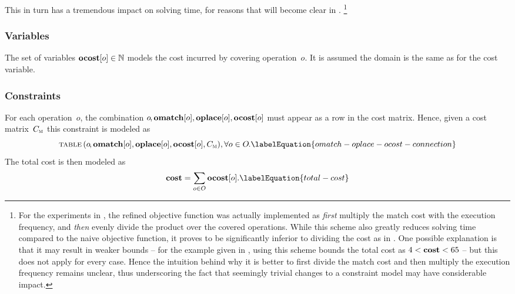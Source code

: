 %
This in turn has a tremendous impact on solving time, for reasons that will
become clear in .\!%
%
\footnote{%
  For the experiments in \cite{HjortBlindellEtAl:2017:CASES}, the refined
  \gls{objective function} was actually implemented as \emph{first} multiply the
  \gls{match} cost with the execution frequency, and \emph{then} evenly divide
  the product over the covered \glspl{operation}.
  While this scheme also greatly reduces solving time compared to the naive
  \gls{objective function}, it proves to be significantly inferior to dividing
  the cost as in .
  One possible explanation is that it may result in weaker bounds -- for the
  example given in , using this scheme bounds the total
  cost as \mbox{$4 < \mVar{cost} < 65$} -- but this does not apply for every
  case.
  Hence the intuition behind why it is better to first divide the \gls{match}
  cost and then multiply the execution frequency remains unclear, thus
  underscoring the fact that seemingly trivial changes to a \gls{constraint
    model} may have considerable impact.%
}


\subsubsection{Variables}

The set of \glspl{variable} \mbox{$\mVar{ocost}[o] \in \mNatNumSet$} models the
cost incurred by covering operation~$o$\hspace{-.8pt}.
%
It is assumed the \gls{domain} is the same as for the \gls{cost variable}.


\subsubsection{Constraints}

For each \gls{operation}~$o$\hspace{-.8pt}, the combination
\mbox{$o\hspace{-.8pt}, \mVar{omatch}[o], \mVar{oplace}[o], \mVar{ocost}[o]$}
must appear as a row in the cost matrix.
%
Hence, given a cost matrix~$C_{\textsc{m}}$ this \gls{constraint} is modeled as
%
\begin{equation}
  \mTable\left(
    o\hspace{-1pt},
    \mVar{omatch}[o],
    \mVar{oplace}[o],
    \mVar{ocost}[o],
    \mCostMatrix
  \right)\!,
  \forall o \in \mOpSet \hspace{-.8pt}.
  \labelEquation{omatch-oplace-ocost-connection}
\end{equation}
%
The total cost is then modeled as
%
\begin{equation}
  \mVar{cost} = \sum_{o \in \mOpSet} \mVar{ocost}[o].
  \labelEquation{total-cost}
\end{equation}


